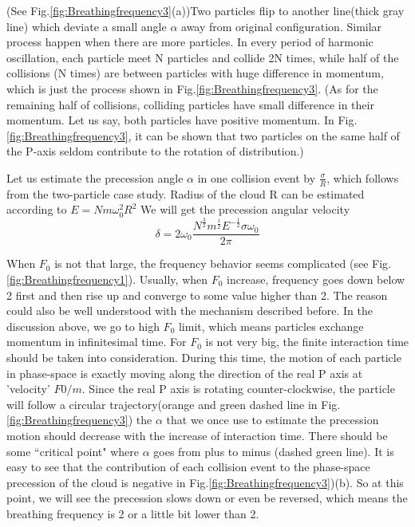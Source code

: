 \documentclass[aps,preprintnumbers,onecolumn,amsmath,amssymb,floatfix,pra]{revtex4-1}
\begin{document}
(See Fig.\ref{fig:Breathingfrequency3}(a))Two particles flip to another line(thick gray line) which deviate a small angle $\alpha$ away from original configuration. Similar process happen when there are more particles. In every period of harmonic oscillation, each particle meet N particles and collide 2N times, while half of the collisions (N times) are between particles with huge difference in momentum, which is just the process shown in Fig.\ref{fig:Breathingfrequency3}. (As for the remaining half of collisions, colliding particles have small difference in their momentum. Let us say, both particles have positive momentum. In Fig.\ref{fig:Breathingfrequency3}, it can be shown that two particles on the same half of the P-axis seldom contribute to the rotation of distribution.)

Let us estimate the precession angle $\alpha$ in one collision event by $\frac{\sigma}{R}$, which follows from the two-particle case study. Radius of the cloud R can be estimated according to $E=Nm\omega_0^2R^2$
We will get the precession angular velocity 
\begin{equation}
\delta=2\omega_0\frac{N^\frac{3}{2}m^{\frac{1}{2}}E^{-\frac{1}{2}}\sigma\omega_0}{2\pi}
\label{eq:breathingfrequency1}
\end{equation}

When $F_0$ is not that large, the frequency behavior seems complicated (see Fig.\ref{fig:Breathingfrequency1}). Usually, when $F_0$ increase, frequency goes down below 2 first and then rise up and converge to some value higher than 2. The reason could also be well understood with the mechanism described before. In the discussion above, we go to high $F_0$ limit, which means particles exchange momentum in infinitesimal time. For $F_0$ is not very big, the finite interaction time should be taken into consideration. During this time, the motion of each particle in phase-space is exactly moving along the direction of the real P axis at 'velocity' $F0/m$. Since the real P axis is rotating counter-clockwise, the particle will follow a circular trajectory(orange and green dashed line in Fig.\ref{fig:Breathingfrequency3}) the $\alpha$ that we once use to estimate the precession motion should decrease with the increase of interaction time. There should be some ``critical point" where $\alpha$ goes from plus to minus (dashed green line). It is easy to see that the contribution of each collision event to the phase-space precession of the cloud is negative in Fig.\ref{fig:Breathingfrequency3})(b). So at this point, we will see the precession  slows down or even be reversed, which means the breathing frequency is 2 or a little bit lower than 2. 
\end{document}
